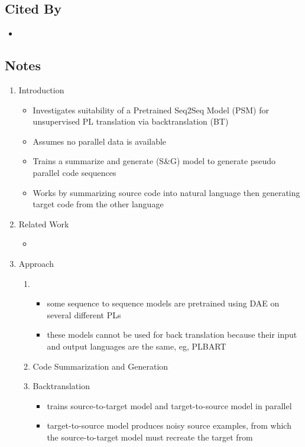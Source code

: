 \documentclass{article}
\begin{document}
\subsection*{Cited By}
\begin{itemize}
	\item
\end{itemize}

\subsection*{Notes}

\begin{enumerate}
	\item Introduction
	\begin{itemize}
		\item Investigates suitability of a Pretrained Seq2Seq Model (PSM) for unsupervised PL translation via backtranslation (BT)
		\item Assumes no parallel data is available
		\item Trains a summarize and generate (S\&G) model to generate pseudo parallel code sequences
		\item Works by summarizing source code into natural language then generating target code from the other language
	\end{itemize}
	\item Related Work
	\begin{itemize}
		\item 
	\end{itemize}
	\item Approach
	\begin{enumerate}
		\item
		\begin{itemize}
			\item some sequence to sequence models are pretrained using DAE on several different PLs
			\item these models cannot be used for back translation because their input and output languages are the same, eg, PLBART
		\end{itemize}
		\item Code Summarization and Generation
		\item Backtranslation
		\begin{itemize}
			\item trains source-to-target model and target-to-source model in parallel
			\item target-to-source model produces noisy source examples, from which the source-to-target model must recreate the target from

\end{itemize}
\end{enumerate}
\end{enumerate}
\end{document}
